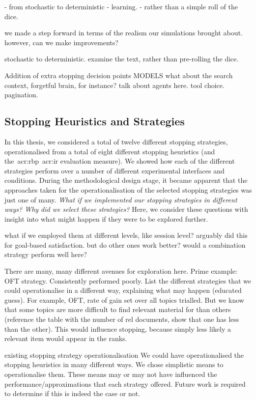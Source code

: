 - from stochastic to deterministic
    - learning.
    - rather than a simple roll of the dice.



we made a step forward in terms of the realism our simulations brought about.
however, can we make improvements?

stochastic to deterministic.
examine the text, rather than pre-rolling the dice.

Addition of extra stopping decision points
MODELS
what about the search context, forgetful brain, for instance?
talk about agents here.
tool choice.
pagination.

\subsection{Stopping Heuristics and Strategies}
In this thesis, we considered a total of twelve different stopping strategies, operationalised from a total of eight different stopping heuristics (and the~\gls{acr:rbp}~\gls{acr:ir} evaluation measure). We showed how each of the different strategies perform over a number of different experimental interfaces and conditions. During the methodological design stage, it became apparent that the approaches taken for the operationalisation of the selected stopping strategies was just one of many. \emph{What if we implemented our stopping strategies in different ways? Why did we select these strategies?} Here, we consider these questions with insight into what might happen if they were to be explored further.

what if we employed them at different levels, like session level?
arguably did this for goal-based satisfaction. but do other ones work better? would a combination strategy perform well here?


There are many, many different avenues for exploration here. Prime example: OFT strategy. Consistently performed poorly. List the different strategies that we could operationalise in a different way, explaining what may happen (educated guess).
For example, OFT, rate of gain set over all topics trialled. But we know that some topics are more difficult to find relevant material for than others (reference the table with the number of rel documents, show that one has less than the other). This would influence stopping, because simply less likely a relevant item would appear in the ranks.

existing stopping strategy operationalisation
We could have operationalised the stopping heuristics in many different ways. We chose simplistic means to operationalise them. These means may or may not have influenced the performance/approximations that each strategy offered. Future work is required to determine if this is indeed the case or not.


